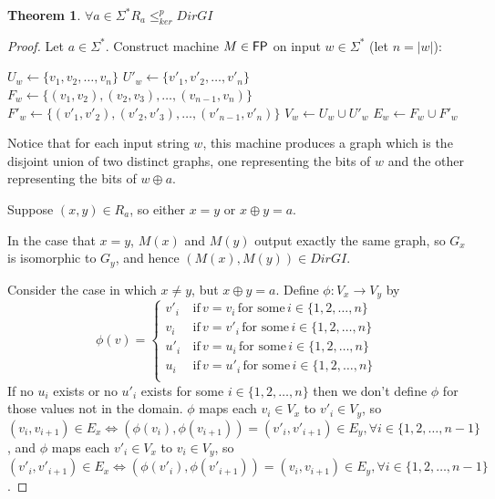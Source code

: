 \documentclass{article}
\newtheorem{theorem}{Theorem}%
\theoremstyle{definition}
\newcommand{\plain}[1]{\,\text{#1}\,} %
\newcommand{\sigmastar}{\Sigma^{*}}
\newcommand{\kr}{\leq^{p}_{ker}} %
\begin{document}
\begin{theorem}\label{thm:ra_kr_dirgi}$\forall a\in\sigmastar R_a \kr DirGI$
\end{theorem}
\begin{proof}
  Let $a\in\sigmastar$. Construct machine $M\in{\ensuremath{\mathsf{FP}}}$ on input $w\in\sigmastar$
  (let $n=|w|$):\\
  \begin{algorithm}[H]
    $U_w\gets\{v_1, v_2, \ldots, v_n\}$\;
    $U'_w\gets\{v'_1, v'_2, \ldots, v'_n\}$\;
    $F_w\gets\{(v_1, v_2), (v_2, v_3), \ldots, (v_{n-1},
    v_n)\}$\;
    $F'_w\gets\{(v'_1, v'_2), (v'_2, v'_3), \ldots, (v'_{n-1},
    v'_n)\}$\;
    $V_w\gets U_w\cup U'_w$\;
    $E_w\gets F_w\cup F'_w$\;
  \end{algorithm}
  Notice that for each input string $w$, this machine produces a graph which is
  the disjoint union of two distinct graphs, one representing the bits of $w$
  and the other representing the bits of $w\oplus a$.
  
  Suppose $(x,y)\in R_a$, so either $x=y$ or $x\oplus y=a$.
  
  In the case that $x=y$, $M(x)$ and $M(y)$ output exactly the same graph, so
  $G_x$ is isomorphic to $G_y$, and hence $(M(x), M(y))\in DirGI$.
  
  Consider the case in which $x\neq y$, but $x\oplus y=a$. Define $\phi:V_x\to
  V_y$ by
  \begin{displaymath}
    \phi(v)=
    \begin{cases}
      v'_i & \plain{if} v=v_i \plain{for some} i\in\{1, 2, \ldots, n\}\\
      v_i & \plain{if} v=v'_i \plain{for some} i\in\{1, 2, \ldots, n\}\\
      u'_i & \plain{if} v=u_i \plain{for some} i\in\{1, 2, \ldots, n\}\\
      u_i & \plain{if} v=u'_i \plain{for some} i\in\{1, 2, \ldots, n\}\\
    \end{cases}
  \end{displaymath}
  If no $u_i$ exists or no $u'_i$ exists for some $i\in\{1, 2, \ldots, n\}$
  then we don't define $\phi$ for those values not in the domain. $\phi$ maps
  each $v_i\in V_x$ to $v'_i\in V_y$, so $(v_i, v_{i+1})\in E_x \iff
  (\phi(v_i), \phi(v_{i+1}))=(v'_i, v'_{i+1})\in E_y, \forall i\in\{1, 2,
  \ldots, n-1\}$, and $\phi$ maps each $v'_i\in V_x$ to $v_i\in V_y$, so
  $(v'_i, v'_{i+1})\in E_x \iff (\phi(v'_i), \phi(v'_{i+1}))=(v_i, v_{i+1})\in
  E_y, \forall i\in\{1, 2, \ldots, n-1\}$.


\end{proof}
\end{document}
